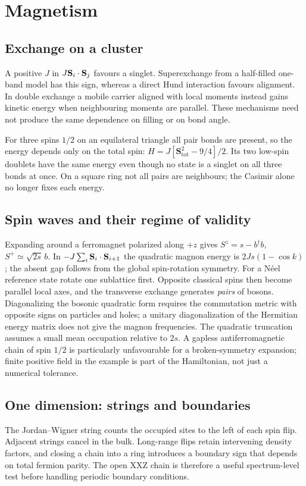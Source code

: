 \chapter{Magnetism}
\section{Exchange on a cluster}
A positive $J$ in $J\mathbf{S}_i\cdot\mathbf{S}_j$ favours a singlet. Superexchange
from a half-filled one-band model has this sign, whereas a direct
Hund interaction favours alignment. In double exchange a mobile
carrier aligned with local moments instead gains kinetic energy
when neighbouring moments are parallel. These mechanisms need not
produce the same dependence on filling or on bond angle.

For three spins $1/2$ on an equilateral triangle all pair bonds are
present, so the energy depends only on the total spin:
$H=J[\mathbf S_\mathrm{tot}^2-9/4]/2$. Its two low-spin doublets
have the same energy even though no state is a singlet on all three
bonds at once. On a square ring not all pairs are neighbours;
the Casimir alone no longer fixes each energy.

\section{Spin waves and their regime of validity}
Expanding around a ferromagnet polarized along $+z$ gives
$S^z=s-b^\dagger b$, $S^+\simeq\sqrt{2s}\,b$. In
$-J\sum_i\mathbf{S}_i\cdot\mathbf{S}_{i+1}$ the quadratic magnon energy is
$2Js(1-\cos k)$; the absent gap follows from the global spin-rotation
symmetry. For a Néel reference state rotate one sublattice first.
Opposite classical spins then become parallel local axes, and the
transverse exchange generates \emph{pairs} of bosons. Diagonalizing
the bosonic quadratic form requires the commutation metric with
opposite signs on particles and holes; a unitary diagonalization of
the Hermitian energy matrix does not give the magnon frequencies.
The quadratic truncation assumes a small mean occupation relative to
$2s$. A gapless antiferromagnetic chain of spin $1/2$ is particularly
unfavourable for a broken-symmetry expansion; finite positive field
in the example is part of the Hamiltonian, not just a numerical tolerance.

\section{One dimension: strings and boundaries}
The Jordan--Wigner string counts the occupied sites to the left of
each spin flip. Adjacent strings cancel in the bulk. Long-range flips
retain intervening density factors, and closing a chain into a ring
introduces a boundary sign that depends on total fermion parity.
The open XXZ chain is therefore a useful spectrum-level test before
handling periodic boundary conditions.

